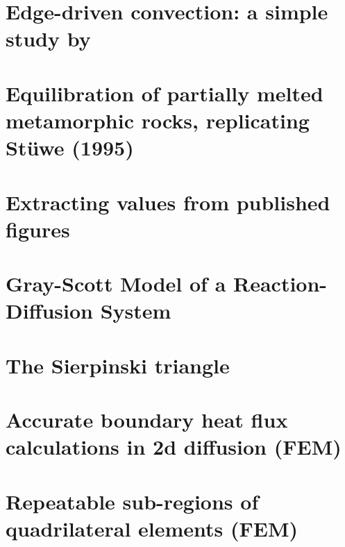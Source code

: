 \documentclass[a4paper,11pt]{report}
\begin{document}
\chapter{Edge-driven convection: a simple study by \textcite{kiso20} \label{f168}} %

\chapter{Equilibration of partially melted metamorphic rocks, replicating St{\"u}we (1995) \label{f169}} %

\chapter{Extracting values from published figures \label{f170}} %

\chapter{Gray-Scott Model of a Reaction-Diffusion System \label{f171}} %

\chapter{The Sierpinski triangle \label{f172}} %

\chapter{Accurate boundary heat flux calculations in 2d diffusion (FEM) \label{f173}} %

\chapter{Repeatable sub-regions of quadrilateral elements (FEM) \label{f174}} %
\end{document}

